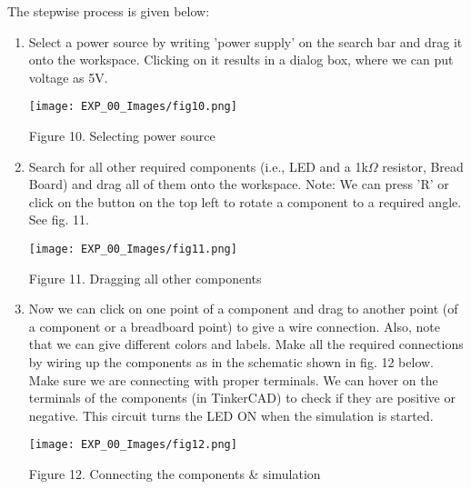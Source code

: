 \documentclass[12pt,a4paper]{article}
\begin{document}
\begin{justify}
\noindent The stepwise process is given below:
\vspace{-3mm}
\begin{enumerate}[label={(\alph*)}]

\item Select a power source by writing 'power supply' on the search bar and drag it onto the workspace. Clicking on it results in a dialog box, where we can put voltage as 5V.

 \begin{center} 
 \texttt{[image: EXP\_00\_Images/fig10.png]}
 \end{center}
 \vspace{-8mm}
 \begin{center} {Figure 10. Selecting power source}\end{center}

 \item Search for all other required components (i.e., LED and a 1k$\Omega$ resistor, Bread Board) and drag all of them onto the workspace. Note: We can press 'R' or click on the button on the top left to rotate a component to a required angle. See fig. 11.

 \begin{center} 
 \texttt{[image: EXP\_00\_Images/fig11.png]}
 \end{center}
 \vspace{-8mm}
 \begin{center} {Figure 11. Dragging all other components}\end{center}



 \item Now we can click on one point of a component and drag to another point (of a component or a breadboard point) to give a wire connection. Also, note that we can give different colors and labels. Make all the required connections by wiring up the components as in the schematic shown in fig. 12 below. Make sure we are connecting with proper terminals. We can hover on the terminals of the components (in TinkerCAD) to check if they are positive or negative. This circuit turns the LED ON when the simulation is started.

 \begin{center} 
 \texttt{[image: EXP\_00\_Images/fig12.png]}
 \end{center}
 \vspace{-8mm}
 \begin{center} {Figure 12. Connecting the components \& simulation}\end{center}
 \end{enumerate}



\end{justify}
\end{document}
